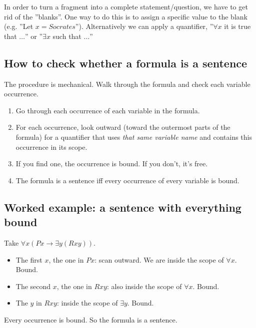 \documentclass[11pt]{article}
\begin{document}
\begin{notebox}
In order to turn a fragment into a complete statement/question, we have to get rid of the ''blanks''. One way to do this is to assign a specific value to the blank (e.g. ''Let $x = Socrates$''). Alternatively we can apply a quantifier, ''$\forall x$ it is true that $\dots$'' or ''$\exists x$ such that $\dots$'' 
\end{notebox}

\subsection{How to check whether a formula is a sentence}

The procedure is mechanical. Walk through the formula and check each variable occurrence.

\begin{template}
\begin{enumerate}
    \item Go through each occurrence of each variable in the formula.
    \item For each occurrence, look outward (toward the outermost parts of the formula) for a quantifier that uses \emph{that same variable name} and contains this occurrence in its scope.
    \item If you find one, the occurrence is bound. If you don't, it's free.
    \item The formula is a sentence iff every occurrence of every variable is bound.
\end{enumerate}
\end{template}

\subsection{Worked example: a sentence with everything bound}

Take $\forall x(Px \to \exists y(Rxy))$.

\begin{itemize}[leftmargin=*]
    \item The first $x$, the one in $Px$: scan outward. We are inside the scope of $\forall x$. Bound.
    \item The second $x$, the one in $Rxy$: also inside the scope of $\forall x$. Bound.
    \item The $y$ in $Rxy$: inside the scope of $\exists y$. Bound.
\end{itemize}

Every occurrence is bound. So the formula is a sentence.
\end{document}
